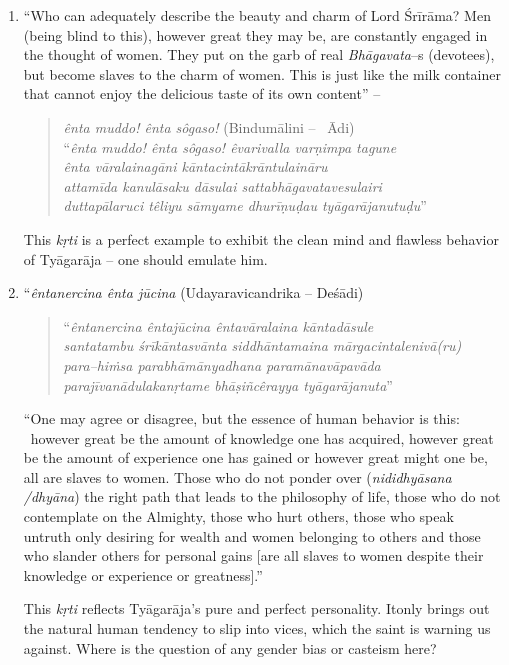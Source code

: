 \begin{enumerate}
 \item 
 “Who can adequately describe the beauty and charm of Lord Śrīrāma? Men (being blind to this), however great they may be, are constantly engaged in the thought of women. They put on the garb of real \textit{Bhāgavata}–s (devotees), but become slaves to the charm of women. This is just like the milk container that cannot enjoy the delicious taste of its own content” –

\begin{verse}
\textit{ênta muddo! ênta sôgaso!} (Bindumālini –  Ādi)\\ “\textit{ênta muddo! ênta sôgaso! êvarivalla varṇimpa tagune}\\\textit{ênta vāralainagāni kāntacintākrāntulaināru}\\\textit{attamīda kanulāsaku dāsulai sattabhāgavatavesulairi}\\\textit{duttapālaruci têliyu sāmyame dhurīṇuḍau tyāgarājanutuḍu}”
\end{verse}

 This \textit{kṛti} is a perfect example to exhibit the clean mind and flawless behavior of Tyāgarāja – one should emulate him.

 \item 
 “\textit{êntanercina ênta jūcina} (Udayaravicandrika – Deśādi)

\begin{verse}
“\textit{êntanercina êntajūcina êntavāralaina kāntadāsule}\\\textit{santatambu śrīkāntasvānta siddhāntamaina mārgacintalenivā(ru)}\\\textit{para–hiṁsa parabhāmānyadhana paramānavāpavāda} \\\textit{parajīvanādulakanṛtame bhāṣiñcêrayya tyāgarājanuta}”
\end{verse}

 “One may agree or disagree, but the essence of human behavior is this:  however great be the amount of knowledge one has acquired, however great be the amount of experience one has gained or however great might one be, all are slaves to women. Those who do not ponder over (\textit{nididhyāsana /dhyāna}) the right path that leads to the philosophy of life, those who do not contemplate on the Almighty, those who hurt others, those who speak untruth only desiring for wealth and women belonging to others and those who slander others for personal gains [are all slaves to women despite their knowledge or experience or greatness].”

 This \textit{kṛti} reflects Tyāgarāja’s pure and perfect personality. Itonly brings out the natural human tendency to slip into vices, which the saint is warning us against. Where is the question of any gender bias or casteism here?

\end{enumerate}

